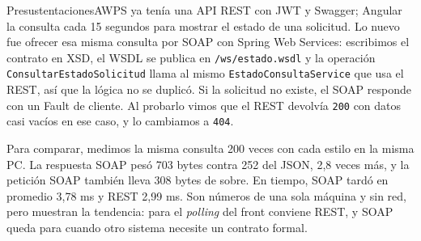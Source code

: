 PresustentacionesAWPS ya tenía una API REST con JWT y Swagger; Angular la consulta cada 15 segundos para mostrar el estado de una solicitud. Lo nuevo fue ofrecer esa misma consulta por SOAP con Spring Web Services: escribimos el contrato en XSD, el WSDL se publica en \texttt{/ws/estado.wsdl} y la operación \texttt{ConsultarEstadoSolicitud} llama al mismo \texttt{EstadoConsultaService} que usa el REST, así que la lógica no se duplicó. Si la solicitud no existe, el SOAP responde con un Fault de cliente. Al probarlo vimos que el REST devolvía \texttt{200} con datos casi vacíos en ese caso, y lo cambiamos a \texttt{404}.

Para comparar, medimos la misma consulta 200 veces con cada estilo en la misma PC. La respuesta SOAP pesó 703 bytes contra 252 del JSON, 2,8 veces más, y la petición SOAP también lleva 308 bytes de sobre. En tiempo, SOAP tardó en promedio 3,78 ms y REST 2,99 ms. Son números de una sola máquina y sin red, pero muestran la tendencia: para el \emph{polling} del front conviene REST, y SOAP queda para cuando otro sistema necesite un contrato formal.

